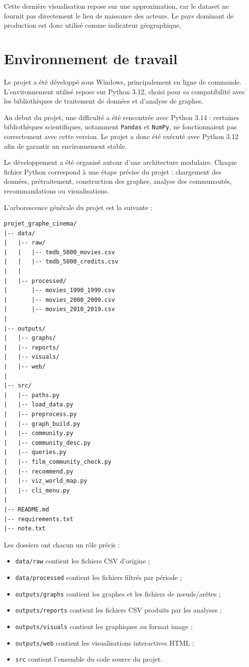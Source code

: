\documentclass[11pt,a4paper,oneside,openany]{report}
\begin{document}
Cette dernière visualisation repose sur une approximation, car le dataset ne fournit pas directement le lieu de naissance des acteurs. Le pays dominant de production est donc utilisé comme indicateur géographique.
\chapter{Environnement de travail}

Le projet a été développé sous Windows, principalement en ligne de commande. L’environnement utilisé repose sur Python 3.12, choisi pour sa compatibilité avec les bibliothèques de traitement de données et d’analyse de graphes.

Au début du projet, une difficulté a été rencontrée avec Python 3.14 : certaines bibliothèques scientifiques, notamment \texttt{Pandas} et \texttt{NumPy}, ne fonctionnaient pas correctement avec cette version. Le projet a donc été exécuté avec Python 3.12 afin de garantir un environnement stable.

Le développement a été organisé autour d’une architecture modulaire. Chaque fichier Python correspond à une étape précise du projet : chargement des données, prétraitement, construction des graphes, analyse des communautés, recommandations ou visualisations.

L’arborescence générale du projet est la suivante :

\begin{verbatim}
projet_graphe_cinema/
|-- data/
|   |-- raw/
|   |   |-- tmdb_5000_movies.csv
|   |   |-- tmdb_5000_credits.csv
|   |
|   |-- processed/
|       |-- movies_1990_1999.csv
|       |-- movies_2000_2009.csv
|       |-- movies_2010_2019.csv
|
|-- outputs/
|   |-- graphs/
|   |-- reports/
|   |-- visuals/
|   |-- web/
|
|-- src/
|   |-- paths.py
|   |-- load_data.py
|   |-- preprocess.py
|   |-- graph_build.py
|   |-- community.py
|   |-- community_desc.py
|   |-- queries.py
|   |-- film_community_check.py
|   |-- recommend.py
|   |-- viz_world_map.py
|   |-- cli_menu.py
|
|-- README.md
|-- requirements.txt
|-- note.txt

\end{verbatim}

Les dossiers ont chacun un rôle précis :

\begin{itemize}
    \item \texttt{data/raw} contient les fichiers CSV d’origine ;
    \item \texttt{data/processed} contient les fichiers filtrés par période ;
    \item \texttt{outputs/graphs} contient les graphes et les fichiers de nœuds/arêtes ;
    \item \texttt{outputs/reports} contient les fichiers CSV produits par les analyses ;
    \item \texttt{outputs/visuals} contient les graphiques au format image ;
    \item \texttt{outputs/web} contient les visualisations interactives HTML ;
    \item \texttt{src} contient l’ensemble du code source du projet.
\end{itemize}
\end{document}

